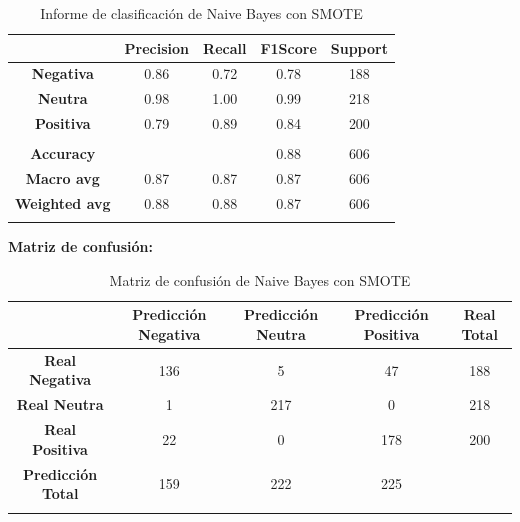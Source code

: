 \documentclass{report}
\begin{document}
{\begin{center}
{                    \begin{longtable}{|c|c|c|c|c|}
                    \hline
                    & \textbf{Precision} & \textbf{Recall} & \textbf{F1Score} & \textbf{Support} \\
                    \hline
                    \textbf{Negativa} & 0.86 & 0.72 & 0.78 & 188 \\
                    \hline
                    \textbf{Neutra} & 0.98 & 1.00 & 0.99 & 218 \\
                    \hline
                    \textbf{Positiva} & 0.79 & 0.89 & 0.84 & 200 \\
                    \hline
                    & \phantom{} & \phantom{} & \phantom{} & \phantom{} \\
                    \hline
                    \textbf{Accuracy} &  &  & 0.88 & 606 \\
                    \hline
                    \textbf{Macro avg} & 0.87 & 0.87 & 0.87 & 606 \\
                    \hline
                    \textbf{Weighted avg} & 0.88 & 0.88 & 0.87 & 606 \\
                    \hline
                      \caption{Informe de clasificación de Naive Bayes con SMOTE}
                    \end{longtable}
            
                    \textbf{Matriz de confusión: }


                    \begin{longtable}{|c|c|c|c|c|}
                    \hline
                     & \textbf{Predicción Negativa} & \textbf{Predicción Neutra} & \textbf{Predicción Positiva} & \textbf{Real Total} \\ \hline
                    \endhead
                    \textbf{Real Negativa} & 136 & 5 & 47 & 188\\ \hline
                    \textbf{Real Neutra} & 1 & 217 & 0 & 218\\ \hline
                    \textbf{Real Positiva} & 22 & 0 & 178 & 200\\ \hline
                    \textbf{Predicción Total} & 159 & 222 & 225  & \\
                    \hline
                                    \caption{Matriz de confusión de Naive Bayes con SMOTE}
                    \end{longtable}}
                    \end{center}
}
\end{document}

